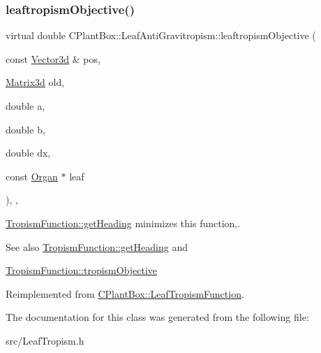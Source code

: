 \subsubsection{\texorpdfstring{leaftropism\+Objective()}{leaftropismObjective()}}
{\footnotesize\ttfamily virtual double C\+Plant\+Box\+::\+Leaf\+Anti\+Gravitropism\+::leaftropism\+Objective (\begin{DoxyParamCaption}\item[{const \hyperlink{classCPlantBox_1_1Vector3d}{Vector3d} \&}]{pos,  }\item[{\hyperlink{classCPlantBox_1_1Matrix3d}{Matrix3d}}]{old,  }\item[{double}]{a,  }\item[{double}]{b,  }\item[{double}]{dx,  }\item[{const \hyperlink{classCPlantBox_1_1Organ}{Organ} $\ast$}]{leaf }\end{DoxyParamCaption})\hspace{0.3cm}{\ttfamily [inline]}, {\ttfamily [override]}, {\ttfamily [virtual]}}



\hyperlink{classCPlantBox_1_1TropismFunction_adb52b88734a94fe1365a00e02c7e6be5}{Tropism\+Function\+::get\+Heading} minimizes this function,. 

\begin{DoxySeeAlso}{See also}
\hyperlink{classCPlantBox_1_1TropismFunction_adb52b88734a94fe1365a00e02c7e6be5}{Tropism\+Function\+::get\+Heading} and 

\hyperlink{classCPlantBox_1_1TropismFunction_a4f2c79fff55d1398c98a070dd8ebbe08}{Tropism\+Function\+::tropism\+Objective} 
\end{DoxySeeAlso}


Reimplemented from \hyperlink{classCPlantBox_1_1LeafTropismFunction_ab89f5f7e80103d80681bc8cadc220dba}{C\+Plant\+Box\+::\+Leaf\+Tropism\+Function}.



The documentation for this class was generated from the following file\+:\begin{DoxyCompactItemize}
\item 
src/Leaf\+Tropism.\+h\end{DoxyCompactItemize}

